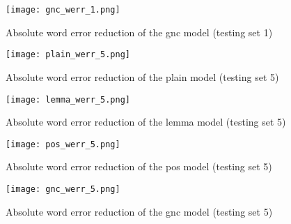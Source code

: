 \begin{figure}[!htbp]
	  \centering
	  \texttt{[image: gnc\_werr\_1.png]}
	      \caption{Absolute word error reduction of the gnc model (testing set 1)}
	      \label{figure:gnc1}
\end{figure}

\begin{figure}[!htbp]
	  \centering
	  \texttt{[image: plain\_werr\_5.png]}
	      \caption{Absolute word error reduction of the plain model (testing set 5)}
	      \label{figure:plain5}
\end{figure}

\begin{figure}[!htbp]
	  \centering
	  \texttt{[image: lemma\_werr\_5.png]}
	      \caption{Absolute word error reduction of the lemma model (testing set 5)}
	      \label{figure:lemmy5}
\end{figure}

\begin{figure}[!htbp]
	  \centering
	  \texttt{[image: pos\_werr\_5.png]}
	      \caption{Absolute word error reduction of the pos model (testing set 5)}
	      \label{figure:pos5}
\end{figure}

\begin{figure}[!htbp]
	  \centering
	  \texttt{[image: gnc\_werr\_5.png]}
	      \caption{Absolute word error reduction of the gnc model (testing set 5)}
	      \label{figure:gnc5}
\end{figure}
